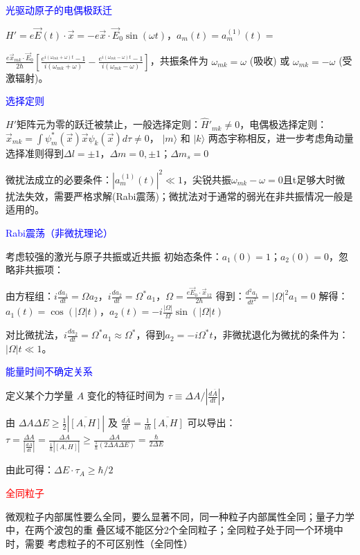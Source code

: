 \documentclass[a4paper,8pt]{extarticle} %
\newcommand{\bluetext}[1]{\textcolor{blue}{#1}}
\newcommand{\redtext}[1]{\textcolor{red}{#1}}
\begin{document}
\begin{multicols}{3}
\bluetext{光驱动原子的电偶极跃迁}

$H' = e\vec{E}(t)\cdot\vec{x} = -e\vec{x}\cdot\vec{E}_0\sin(\omega t)$，$a_m(t) = a_m^{(1)}(t) =$ 

$ \frac{e\vec{x}_{mk}\cdot\vec{E}_0}{2\hbar}\left[\frac{e^{i(\omega_{mk}+\omega)t}-1}{i(\omega_{mk}+\omega)} - \frac{e^{i(\omega_{mk}-\omega)t}-1}{i(\omega_{mk}-\omega)}\right]$，共振条件为 $\omega_{mk} = \omega$ (吸收) 或 $\omega_{mk} = -\omega$ (受激辐射)。

\bluetext{选择定则}

$H'$矩阵元为零的跃迁被禁止，一般选择定则：$\hat{H}'_{mk}\neq 0$，电偶极选择定则：$\vec{x}_{mk}=\int{\psi_m^*(\vec{x})\vec{x}\psi_k(\vec{x}) d\tau} \neq 0$，
$|m\rangle$ 和 $|k\rangle$ 两态宇称相反，进一步考虑角动量选择准则得到$\Delta l = \pm1$，$\Delta m = 0, \pm1$；$\Delta m_s = 0$

微扰法成立的必要条件：$|a_m^{(1)}(t)|^2\ll 1$，尖锐共振$\omega_{mk}-\omega=0$且t足够大时微扰法失效，需要严格求解(Rabi震荡)；微扰法对于通常的弱光在非共振情况一般是适用的。

\bluetext{Rabi震荡（非微扰理论）}

考虑较强的激光与原子共振或近共振
初始态条件：$a_1(0) = 1$；$a_2(0) = 0$，忽略非共振项：

由方程组：$i\frac{da_1}{dt} = \Omega a_2$，$i\frac{da_2}{dt} = \Omega^* a_1$，$\Omega = \frac{e\vec{E}_0\cdot\vec{x}_{12}}{2\hbar}$ 得到：$\frac{d^2a_1}{dt^2} = |\Omega|^2 a_1 = 0$ 解得：$a_1(t) = \cos(|\Omega|t)$，$a_2(t) = -i\frac{|\Omega|}{\Omega}\sin(|\Omega|t)$

对比微扰法，$i\frac{da_2}{dt} = \Omega^* a_1 \approx \Omega^* $，得到$a_2 = -i\Omega^* t$，非微扰退化为微扰的条件为：$|\Omega|t \ll 1$。

\bluetext{能量时间不确定关系}

定义某个力学量 $A$ 变化的特征时间为 $\tau \equiv \Delta A/|\frac{d\overline{A}}{dt}|$，

由 $\Delta A\Delta E \geq \frac{1}{2}|\overline{[A,H]}|$ 及 $\frac{d\overline{A}}{dt}=\frac{1}{i\hbar}\overline{[A,H]}$ 可以导出：
$\tau = \frac{\Delta A}{|\frac{d\overline{A}}{dt}|} = \frac{\Delta A}{\frac{1}{\hbar}|\overline{[A,H]}|} \geq \frac{\Delta A}{\frac{1}{\hbar}(2\Delta A\Delta E)} = \frac{\hbar}{2\Delta E}$

由此可得：$\Delta E \cdot \tau_A \geq \hbar/2$

\redtext{全同粒子}

微观粒子内部属性要么全同，要么显著不同，同一种粒子内部属性全同；量子力学中，在两个波包的重
叠区域不能区分2个全同粒子；全同粒子处于同一个环境中时，需要
考虑粒子的不可区别性（全同性）


\end{multicols}
\end{document}
